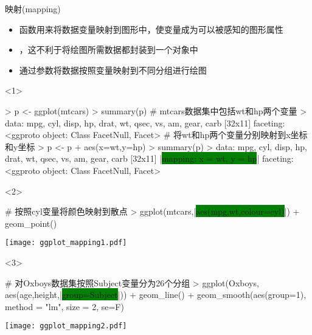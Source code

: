 \begin{frame}[t,fragile]{\subsecname}{映射(mapping)}
\begin{itemize}
\item<1-> 函数用来将数据变量映射到图形中，使变量成为可以被感知的图形属性
\item<1-> ，这不利于将绘图所需数据都封装到一个对象中
\item<3-> 通过参数将数据按照变量映射到不同分组进行绘图
\end{itemize}

\begin{overlayarea}{\textwidth}{\textheight}
\begin{onlyenv}<1>
\begin{rcode}
> p <- ggplot(mtcars)
> summary(p)
# mtcars数据集中包括wt和hp两个变量
> data: mpg, cyl, disp, hp, drat, wt, qsec, vs, am, gear, carb [32x11]
  faceting: <ggproto object: Class FacetNull, Facet>
# 将wt和hp两个变量分别映射到x坐标和y坐标
> p <- p + aes(x=wt,y=hp)
> summary(p)
> data: mpg, cyl, disp, hp, drat, wt, qsec, vs, am, gear, carb [32x11]
  |\colorbox{green}{mapping:  x = wt, y = hp}|
  faceting: <ggproto object: Class FacetNull, Facet>
\end{rcode}
\end{onlyenv}

\begin{onlyenv}<2>
\begin{minipage}{\textwidth}
\begin{rcode}
# 按照cyl变量将颜色映射到散点 
> ggplot(mtcars,|\colorbox{green}{aes(mpg,wt,colour=cyl)}|) + geom_point()
\end{rcode}
\end{minipage}

\begin{minipage}{\textwidth}
\centering
\texttt{[image: ggplot\_mapping1.pdf]}
\end{minipage}
\end{onlyenv}

\begin{onlyenv}<3>
\begin{minipage}{\textwidth}
\begin{rcode}
# 对Oxboys数据集按照Subject变量分为26个分组
> ggplot(Oxboys, aes(age,height,|\colorbox{green}{group=Subject}|)) + geom_line() +
     geom_smooth(aes(group=1), method = "lm", size = 2, se=F)
\end{rcode}
\end{minipage}

\begin{minipage}{\textwidth}
\centering
\texttt{[image: ggplot\_mapping2.pdf]}
\end{minipage}
\end{onlyenv}
\end{overlayarea}
\end{frame}


